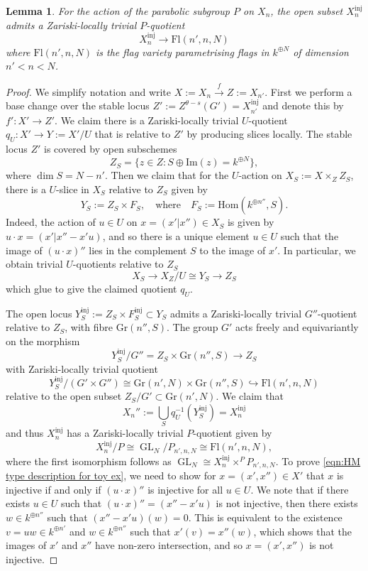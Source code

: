 \documentclass[a4paper,12pt]{article}
\theoremstyle{definition}
\theoremstyle{plain}
\newtheorem{lemma}[definition]{Lemma}
\theoremstyle{remark}
\DeclareMathOperator{\GL}{GL}
\begin{document}
\begin{lemma}\label{lemma toy model without mult}
For the action of the parabolic subgroup $P$ on $X_n$, the open subset $X_n^{\mathrm{inj}}$ admits a Zariski-locally trivial $P$-quotient
\[ X_n^{\mathrm{inj}} \rightarrow \mathrm{Fl}(n',n,N)\]
where $\mathrm{Fl}(n',n,N)$ is the flag variety parametrising flags in $k^{\oplus N}$ of dimension $n' < n < N$.
\end{lemma}
\begin{proof}
We simplify notation and write $X:=X_n \stackrel{f}{\rightarrow} Z:=X_{n'}$. First we perform a base change over the stable locus $Z':= Z^{\theta-s}(G') = X_{n'}^{\mathrm{inj}}$ and denote this by $f' \colon X' \rightarrow Z'$. We claim there is a Zariski-locally trivial $U$-quotient $q_U \colon X' \rightarrow Y := X'/U$ that is relative to $Z'$ by producing slices locally. The stable locus $Z'$ is covered by open subschemes 
\[ Z_S = \{ z \in Z: S \oplus \mathrm{Im}(z) = k^{\oplus N} \}, \]
where $\dim S = N -n'$. Then we claim that for the $U$-action on $X_S:=X \times_Z Z_S$, there is a $U$-slice in $X_S$ relative to $Z_S$ given by
\[ Y_S := Z_S \times F_S, \quad \text{where} \quad F_S:=\mathrm{Hom}(k^{\oplus n''}, S).\]
Indeed, the action of $u \in U$ on $x = (x' | x'') \in X_S$ is given by $ u \cdot x = (x'| x'' - x'u)$, 
and so there is a unique element $u \in U$ such that the image of $(u \cdot x)''$ lies in the complement $S$ to the image of $x'$. In particular, we obtain trivial $U$-quotients relative to $Z_S$
\[ X_S \rightarrow X_Z / U  \cong Y_S \rightarrow Z_S\]
which glue to give the claimed quotient $q_U$. 

The open locus $Y^{\mathrm{inj}}_S:= Z_S \times F_S^{\mathrm{inj}} \subset Y_S$ admits a Zariski-locally trivial $G''$-quotient relative to $Z_S$, with fibre $\mathrm{Gr}(n'',S)$. The group $G'$ acts freely and equivariantly on the morphism
\[ Y^{\mathrm{inj}}_S/G'' = Z_S \times \mathrm{Gr}(n'',S) \rightarrow Z_S\]
with Zariski-locally trivial quotient 
\[ Y^{\mathrm{inj}}_S/(G' \times G'') \cong \mathrm{Gr}(n',N) \times \mathrm{Gr}(n'',S) \hookrightarrow \mathrm{Fl}(n',n,N)\]
relative to the open subset $Z_S/G' \subset \mathrm{Gr}(n',N)$. We claim that 
\begin{equation}\label{eqn:HM type description for toy ex}
    X_n'':=\bigcup_S q_U^{-1}(Y_S^{\mathrm{inj}}) = X_n^{\mathrm{inj}}
\end{equation}
and thus $X_n^{\mathrm{inj}}$ has a Zariski-locally trivial $P$-quotient given by 
\[ X_n^{\mathrm{inj}} / P \cong \GL_N / P_{n',n,N} \cong \mathrm{Fl}(n',n,N),\]
where the first isomorphism follows as $\GL_N \cong X_n^{\mathrm{inj}} \times^P P_{n',n,N}$. 
To prove \cref{eqn:HM type description for toy ex}, we need to show for $x = (x',x'') \in X'$ that $x$ is injective if and only if $(u \cdot x)''$ is injective for all $u \in U$. We note that if there exists $u \in U$ such that $(u \cdot x)'' = (x'' - x' u)$ is not injective, then there exists $w \in k^{\oplus n''}$ such that $(x'' - x' u)(w) = 0$. This is equivalent to the existence $v=uw \in k^{\oplus n'}$ and $w \in k^{\oplus n''}$ such that $x'(v) = x''(w)$, which shows that the images of $x'$ and $x''$ have non-zero intersection, and so $x = (x', x'')$ is not injective.
\end{proof}
\end{document}
